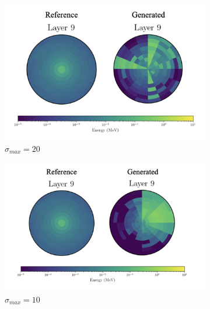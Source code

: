 \begin{figure}
    \centering
    \begin{subfigure}[b]{0.23\textwidth}
        \centering
        \includegraphics[width=\textwidth]{Figures/vp20_6.png}
        \caption{$\sigma_{max}=20$}
        \label{fig:vp20_6}
    \end{subfigure}
    \hfill
    \begin{subfigure}[b]{0.23\textwidth}
        \centering
        \includegraphics[width=\textwidth]{Figures/vp10_6.png}
        \caption{$\sigma_{max}=10$}
        \label{fig:vp10_6}
    \end{subfigure}
    \hfill
    \begin{subfigure}[b]{0.23\textwidth}
        \centering

\end{subfigure}
\end{figure}
